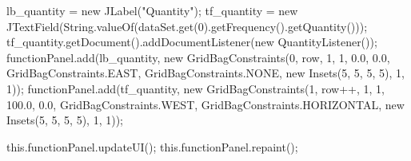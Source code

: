 \begin{codigo}[caption={Código para gerar a os parâmetros para a modulação}, label={code:panel-all}, breaklines=true]
{		lb_quantity = new JLabel("Quantity");
		tf_quantity = new JTextField(String.valueOf(dataSet.get(0).getFrequency().getQuantity()));
		tf_quantity.getDocument().addDocumentListener(new QuantityListener());
		functionPanel.add(lb_quantity, new GridBagConstraints(0, row, 1, 1, 0.0, 0.0, GridBagConstraints.EAST,
		GridBagConstraints.NONE, new Insets(5, 5, 5, 5), 1, 1));
		functionPanel.add(tf_quantity, new GridBagConstraints(1, row++, 1, 1, 100.0, 0.0, GridBagConstraints.WEST,
		GridBagConstraints.HORIZONTAL, new Insets(5, 5, 5, 5), 1, 1));
		
		this.functionPanel.updateUI();
		this.functionPanel.repaint();
		
	}
\end{codigo}